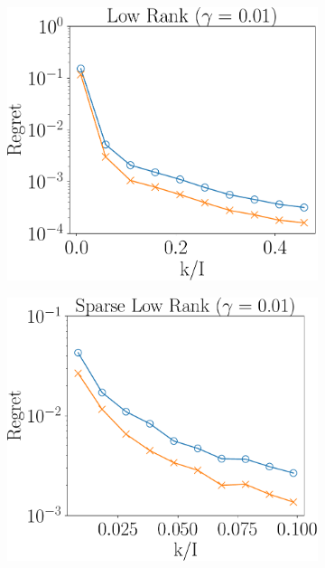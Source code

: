\begin{figure}
	\centering
	\begin{subfigure}{0.3\textwidth}
		\includegraphics[scale = 0.24]{figure/fig3_lk_lnoise_600.pdf}
	\end{subfigure}
	\begin{subfigure}{0.3\textwidth}
		\includegraphics[scale = 0.24]{figure/fig3_slk_lnoise_600.pdf}
	\end{subfigure}
	\begin{subfigure}{0.3\textwidth}

\end{subfigure}
\end{figure}
